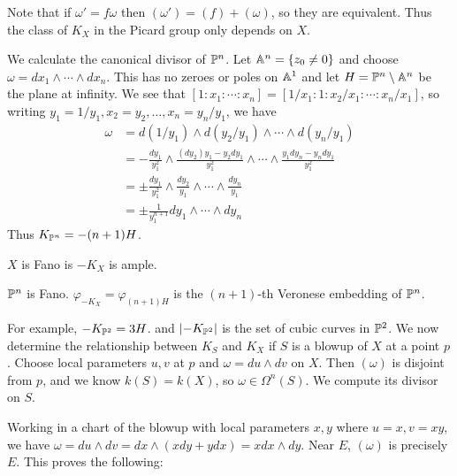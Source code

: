 \documentclass[twoside, 10pt]{article}
\begin{document}
        Note that if $\omega' = f\omega$ then $(\omega') = (f) + (\omega)$, so they are equivalent. Thus the class of $K_X$ in the Picard group only depends on $X$.

        \begin{exm}
            We calculate the canonical divisor of $\P^n$. Let $\A^n = \{ z_0 \neq 0 \}$ and choose $\omega = dx_1 \land \cdots \land dx_n$. This has no zeroes or poles on $\A^1$ and let $H = \P^n \setminus \A^n$ be the plane at infinity. We see that $[1:x_1: \cdots: x_n] = [1/x_1: 1 : x_2/x_1 : \cdots : x_n/x_1]$, so writing $y_1 = 1/y_1, x_2 = y_2, \ldots, x_n = y_n/y_1$, we have 
            \begin{align*}
                \omega &= d(1/y_1) \land d(y_2/y_1) \land \cdots \land d(y_n/y_1) \\ 
                       &= -\frac{dy_1}{y_1^2} \land \frac{(dy_2)y_1 - y_2 dy_1}{y_1^2} \land \cdots \land \frac{y_1dy_n - y_ndy_1}{y_1^2} \\ 
                       &= \pm \frac{dy_1}{y_1^2} \land \frac{dy_2}{y_1} \land \cdots \land \frac{dy_n}{y_1} \\ 
                       &= \pm \frac{1}{y_1^{n+1}} dy_1 \land \cdots \land dy_n 
            \end{align*} 
            Thus $K_{\P^n} = -(n+1)H$.
        \end{exm}

        \begin{defn}
            $X$ is Fano is $-K_X$ is ample.
        \end{defn}

        \begin{cor}
            $\P^n$ is Fano. $\varphi_{-K_X} = \varphi_{(n+1)H}$ is the $(n+1)$-th Veronese embedding of $\P^n$.
        \end{cor}

        For example, $-K_{\P^2} = 3H$. and $\abs{-K_{\P^2}}$ is the set of cubic curves in $\P^2$. We now determine the relationship between $K_S$ and $K_X$ if $S$ is a blowup of $X$ at a point $p$. Choose local parameters $u,v$ at $p$ and $\omega = du \land dv$ on $X$. Then $(\omega)$ is disjoint from $p$, and we know $k(S) = k(X)$, so $\omega \in \Omega^n(S)$. We compute its divisor on $S$.

        Working in a chart of the blowup with local parameters $x,y$ where $u = x, v = xy$, we have $\omega = du \land dv = dx \land (x dy + y dx) = x dx \land dy$. Near $E$, $(\omega)$ is precisely $E$. This proves the following:
\end{document}
